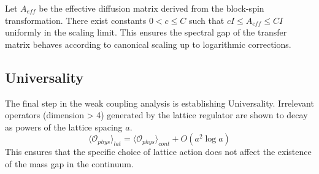 \begin{lemma}
Let \(A_{eff}\) be the effective diffusion matrix derived from the block-spin transformation. There exist constants \(0 < c \le C\) such that \(c I \le A_{eff} \le C I\) uniformly in the scaling limit. This ensures the spectral gap of the transfer matrix behaves according to canonical scaling up to logarithmic corrections.
\end{lemma}

\subsection{Universality}
The final step in the weak coupling analysis is establishing Universality. Irrelevant operators (dimension > 4) generated by the lattice regulator are shown to decay as powers of the lattice spacing \(a\).
\begin{equation}
\langle \mathcal{O}_{phys} \rangle_{lat} = \langle \mathcal{O}_{phys} \rangle_{cont} + O(a^2 \log a)
\end{equation}
This ensures that the specific choice of lattice action does not affect the existence of the mass gap in the continuum.


